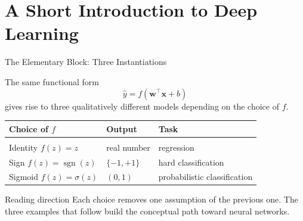 \documentclass[11pt,aspectratio=169,professionalfonts]{beamer}
\begin{document}
\section{A Short Introduction to Deep Learning}
%
\begin{frame}{The Elementary Block: Three Instantiations}

The same functional form
\[
  \hat{y} = f(\mathbf{w}^{\top}\mathbf{x} + b)
\]
gives rise to three qualitatively different models depending on the choice of $f$.

\medskip
\begin{center}
\begin{tabular}{lll}
\hline
\textbf{Choice of $f$} & \textbf{Output} & \textbf{Task} \\
\hline\\
Identity $f(z)=z$ & real number & regression \\
Sign $f(z)=\operatorname{sgn}(z)$ & $\{-1,+1\}$ & hard classification \\
Sigmoid $f(z)=\sigma(z)$ & $(0,1)$ & probabilistic classification \\
\hline
\end{tabular}
\end{center}

\begin{block}{Reading direction}
Each choice removes one assumption of the previous one.
The three examples that follow build the conceptual path toward neural networks.
\end{block}

\end{frame}
%
%
\end{document}
